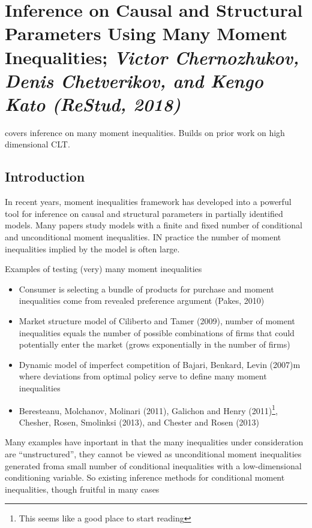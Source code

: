 

\newpage
\section{Inference on Causal and Structural Parameters Using Many Moment Inequalities; \textit{\small Victor Chernozhukov, Denis Chetverikov, and Kengo Kato (ReStud, 2018)}}\label{sec:CCK-2019}

\citet{CCK-2018} covers inference on many moment inequalities. Builds on prior work on high dimensional CLT.

\subsection{Introduction}

In recent years, moment inequalities framework has developed into a powerful tool for inference on causal and structural parameters in partially identified models. Many papers study models with a finite and fixed number of conditional and unconditional moment inequalities. IN practice the number of moment inequalities implied by the model is often large. 

Examples of testing (very) many moment inequalities
\begin{itemize}
	\item Consumer is selecting a bundle of products for purchase and moment inequalities come from revealed preference argument (Pakes, 2010)
	\item Market structure model of Ciliberto and Tamer (2009), number of moment inequalities equals the number of possible combinations of firms that could potentially enter the market (grows exponentially in the number of firms)
	\item Dynamic model of imperfect competition of Bajari, Benkard, Levin (2007)m where deviations from optimal policy serve to define many moment inequalities
	\item Beresteanu, Molchanov, Molinari (2011), Galichon and Henry (2011)\footnote{This seems like a good place to start reading}, Chesher, Rosen, Smolinksi (2013), and Chester and Rosen (2013)
\end{itemize}
Many examples have inportant in that the many inequalities under consideration are ``unstructured'', they cannot be viewed as unconditional moment inequalities generated froma small number of conditional inequalities with a low-dimensional conditioning variable. So existing inference methods for conditional moment inequalities, though fruitful in many cases 

